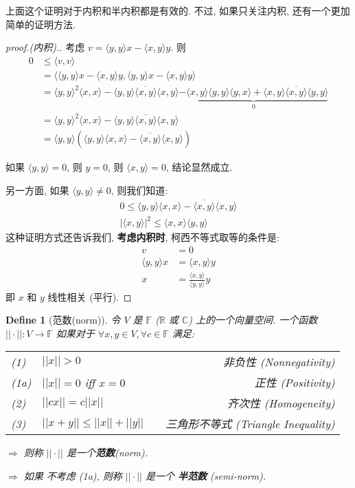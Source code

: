 \documentclass{article}
\newtheorem{define}{Define}
\def\<{\langle}
\def\>{\rangle}
\begin{document}
上面这个证明对于内积和半内积都是有效的.
不过, 如果只关注内积, 还有一个更加简单的证明方法.
\begin{proof}[proof.(内积).]
  考虑 $v = \<y, y\>x - \<x, y\> y$. 则
  \begin{align*}
    0 &\leq \<v,v\> \\
      &= \<\<y, y\>x - \<x, y\> y, \<y, y\>x - \<x, y\> y\> \\
      &= \<y,y\>^2\<x,x\> - \<y,y\>\overline{\<x,y\>}\<x,y\> \underbrace{-\<x,y\>\<y,y\>\<y,x\> + \<x,y\>\overline{\<x,y\>}\<y,y\>}_{0} \\
      &= \<y,y\>^2\<x,x\> - \<y,y\>\overline{\<x,y\>}\<x,y\> \\
    &= \<y, y\> (\<y, y\>\<x, x\> - \overline{\<x, y\>}\<x, y\>)
  \end{align*}
  
  如果 $\<y, y\> = 0$, 则 $y = 0$, 则 $\<x, y\> = 0$, 结论显然成立.

  另一方面, 如果 $\<y, y\> \not= 0$, 则我们知道:
  \begin{align*}
    0 \leq \<y, y\>\<x, x\> - \overline{\<x, y\>}\<x, y\> \\
    |\<x, y\>|^2 \leq \<x,x\>\<y,y\>
  \end{align*}
  这种证明方式还告诉我们, \textbf{考虑内积时}, 柯西不等式取等的条件是:
  \begin{align*}
    v &= 0 \\
    \<y,y\>x &= \<x, y\>y \\
    x &= \frac{\<x, y\>}{\<y,y\>}y
  \end{align*}
  即 $x$ 和 $y$ 线性相关 (平行).
\end{proof}
\begin{define}[范数(norm)]
  令 $V$ 是 $\mathbb{F}$ ($\mathbb{R}$ 或 $\mathbb{C}$) 上的一个向量空间.
  一个函数 $||\cdot||: V\to \mathbb{F}$ 如果对于 $\forall x, y\in V, \forall c\in \mathbb{F}$ 满足:
  
  \begin{tabularx}{0.9\textwidth}{llXr}
    (1) & $||x|| > 0$ && 非负性 (Nonnegativity) \\
    (1a) & $||x|| = 0$ iff $x = 0$ && 正性 (Positivity) \\
    (2) & $||cx|| = c||x||$ && 齐次性 (Homogeneity) \\
    (3) & $||x + y || \leq ||x|| + ||y||$ && 三角形不等式 (Triangle Inequality)
  \end{tabularx}

  $\Rightarrow$ 则称 $||\cdot||$ 是一个\textbf{范数}(norm).
  
  $\Rightarrow$ 如果 不考虑 (1a), 则称 $||\cdot||$ 是一个 \textbf{半范数} (semi-norm).
\end{define}
\end{document}
